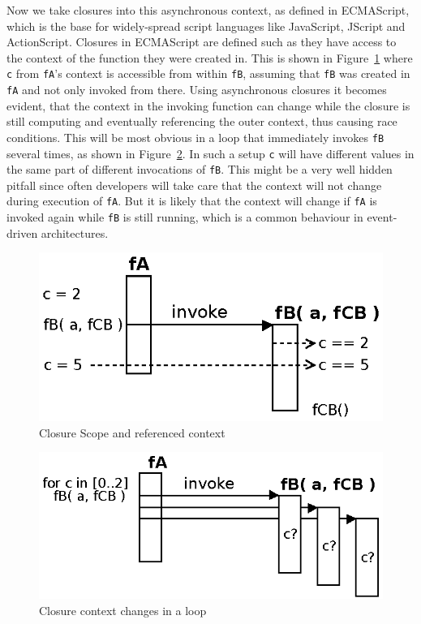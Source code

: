 Now we take closures into this asynchronous context, as defined in ECMAScript\cite{EcmaScript}, which is the base for widely-spread script languages like JavaScript, JScript and ActionScript.
Closures in ECMAScript\cite{EcmaScript} are defined such as they have access to the context of the function they were created in.
This is shown in Figure~\ref{fig:Closures_Closure-1} where \texttt{c} from \texttt{fA}'s context is accessible from within \texttt{fB}, assuming that \texttt{fB} was created in \texttt{fA} and not only invoked from there.
Using asynchronous closures it becomes evident, that the context in the invoking function can change while the closure is still computing and eventually referencing the outer context, thus causing race conditions.
This will be most obvious in a loop that immediately invokes \texttt{fB} several times, as shown in Figure~\ref{fig:Closures_Closure-2}.
In such a setup \texttt{c} will have different values in the same part of different invocations of \texttt{fB}.
This might be a very well hidden pitfall since often developers will take care that the context will not change during execution of \texttt{fA}.
But it is likely that the context will change if \texttt{fA} is invoked again while \texttt{fB} is still running, which is a common behaviour in event-driven architectures.
\begin{figure}[h!]
	\centering
  \includegraphics{figures/Closures_Closure-1}
	\caption{Closure Scope and referenced context}
	\label{fig:Closures_Closure-1}
\end{figure}
\begin{figure}[h!]
	\centering
  \includegraphics{figures/Closures_Closure-2}
	\caption{Closure context changes in a loop}
	\label{fig:Closures_Closure-2}
\end{figure}


